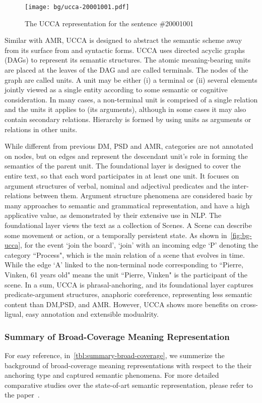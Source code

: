 \begin{figure}[!th]
\centering
\texttt{[image: bg/ucca-20001001.pdf]}
\caption{\label{fig:bg-ucca}The UCCA representation for the sentence
  \#20001001}
\end{figure}

Similar with AMR, UCCA is designed to abstract the semantic scheme
away from its surface from and syntactic forms. UCCA uses directed
acyclic graphs (DAGs) to represent its semantic structures. The atomic
meaning-bearing units are placed at the leaves of the DAG and are
called terminals. The nodes of the graph are called units. A unit may
be either (i) a terminal or (ii) several elements jointly viewed as a
single entity according to some semantic or cognitive
consideration. In many cases, a non-terminal unit is comprised of a
single relation and the units it applies to (its arguments), although
in some cases it may also contain secondary relations. Hierarchy is
formed by using units as arguments or relations in other units.

While different from previous DM, PSD and AMR, categories are not
annotated on nodes, but on edges and represent the descendant unit's
role in forming the semantics of the parent unit. The foundational
layer is designed to cover the entire text, so that each word
participates in at least one unit. It focuses on argument structures
of verbal, nominal and adjectival predicates and the inter-relations
between them. Argument structure phenomena are considered basic by
many approaches to semantic and grammatical representation, and have a
high applicative value, as demonstrated by their extensive use in
NLP. The foundational layer views the text as a collection of
Scenes. A Scene can describe some movement or action, or a temporally
persistent state. As shown in~\autoref{fig:bg-ucca}, for the event
`join the board', `join' with an incoming edge `P' denoting the
category ``Process", which is the main relation of a scene that
evolves in time. While the edge `A' linked to the non-terminal node
corresponding to ``Pierre, Vinken, 61 years old" means the unit
``Pierre, Vinken" is the participant of the scene. In a sum, UCCA is
phrasal-anchoring, and its foundational layer captures
predicate-argument structures, anaphoric coreference, representing
less semantic content than DM,PSD, and AMR. However, UCCA shows more
benefits on cross-ligual, easy annotation and extensible modualrity.


\subsubsection{Summary of Broad-Coverage Meaning Representation}
\label{ssec:bg:summary-broad-coverage}
For easy reference, in~\autoref{tbl:summary-broad-coverage}, we summerize the background of
broad-coverage meaning representations with respect to the their
anchoring type and captured semantic phenomena. For more detailed
comparative studies over the state-of-art semantic representation,
please refer to the paper~\cite{abend2017state}.

